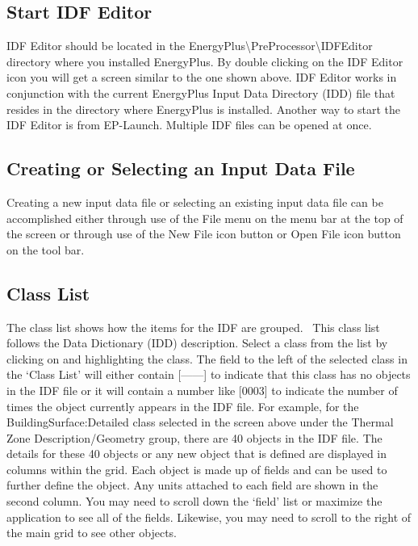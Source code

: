 \subsection{Start IDF Editor}\label{start-idf-editor}

IDF Editor should be located in the EnergyPlus\textbackslash{}PreProcessor\textbackslash{}IDFEditor directory where you installed EnergyPlus. By double clicking on the IDF Editor icon you will get a screen similar to the one shown above. IDF Editor works in conjunction with the current EnergyPlus Input Data Directory (IDD) file that resides in the directory where EnergyPlus is installed. Another way to start the IDF Editor is from EP-Launch. Multiple IDF files can be opened at once.

\subsection{Creating or Selecting an Input Data File}\label{creating-or-selecting-an-input-data-file}

Creating a new input data file or selecting an existing input data file can be accomplished either through use of the File menu on the menu bar at the top of the screen or through use of the New File icon button or Open File icon button on the tool bar.

\subsection{Class List}\label{class-list}

The class list shows how the items for the IDF are grouped.~ This class list follows the Data Dictionary (IDD) description. Select a class from the list by clicking on and highlighting the class. The field to the left of the selected class in the `Class List' will either contain {[}------{]} to indicate that this class has no objects in the IDF file or it will contain a number like {[}0003{]} to indicate the number of times the object currently appears in the IDF file. For example, for the BuildingSurface:Detailed class selected in the screen above under the Thermal Zone Description/Geometry group, there are 40 objects in the IDF file. The details for these 40 objects or any new object that is defined are displayed in columns within the grid. Each object is made up of fields and can be used to further define the object. Any units attached to each field are shown in the second column. You may need to scroll down the `field' list or maximize the application to see all of the fields. Likewise, you may need to scroll to the right of the main grid to see other objects.

